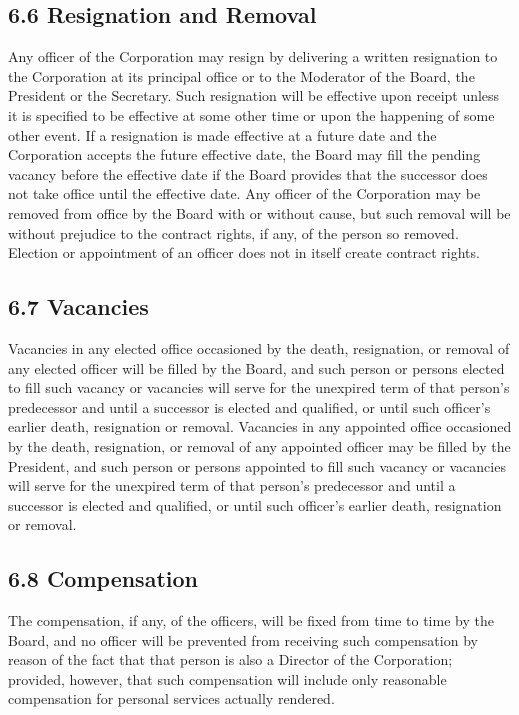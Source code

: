 \documentclass[
]{book}
\begin{document}
\subsection{6.6 Resignation and Removal}\label{resignation-and-removal}

Any officer of the Corporation may resign by delivering a written resignation to the Corporation at its principal office or to the Moderator of the Board, the President or the Secretary. Such resignation will be effective upon receipt unless it is specified to be effective at some other time or upon the happening of some other event. If a resignation is made effective at a future date and the Corporation accepts the future effective date, the Board may fill the pending vacancy before the effective date if the Board provides that the successor does not take office until the effective date. Any officer of the Corporation may be removed from office by the Board with or without cause, but such removal will be without prejudice to the contract rights, if any, of the person so removed. Election or appointment of an officer does not in itself create contract rights.

\subsection{6.7 Vacancies}\label{vacancies}

Vacancies in any elected office occasioned by the death, resignation, or removal of any elected officer will be filled by the Board, and such person or persons elected to fill such vacancy or vacancies will serve for the unexpired term of that person's predecessor and until a successor is elected and qualified, or until such officer's earlier death, resignation or removal. Vacancies in any appointed office occasioned by the death, resignation, or removal of any appointed officer may be filled by the President, and such person or persons appointed to fill such vacancy or vacancies will serve for the unexpired term of that person's predecessor and until a successor is elected and qualified, or until such officer's earlier death, resignation or removal.

\subsection{6.8 Compensation}\label{compensation}

The compensation, if any, of the officers, will be fixed from time to time by the Board, and no officer will be prevented from receiving such compensation by reason of the fact that that person is also a Director of the Corporation; provided, however, that such compensation will include only reasonable compensation for personal services actually rendered.
\end{document}
